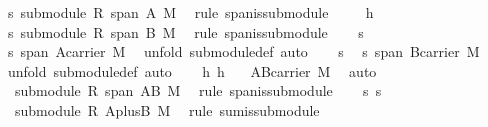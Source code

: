 \begin{isabellebody}
\ s{}{\isacharcolon}\ {\isachardoublequoteopen}submodule\ R\ {\isacharparenleft}span\ A{\isacharparenright}\ M{\isachardoublequoteclose}\ \isamarkupfalse%
\ {\isacharparenleft}rule\ span{\isacharunderscore}is{\isacharunderscore}submodule{\isacharparenright}\isanewline
\ \ \isamarkupfalse%
\ \ h{}\ \isamarkupfalse%
\ s{}{\isacharcolon}\ {\isachardoublequoteopen}submodule\ R\ {\isacharparenleft}span\ B{\isacharparenright}\ M{\isachardoublequoteclose}\ \isamarkupfalse%
\ {\isacharparenleft}rule\ span{\isacharunderscore}is{\isacharunderscore}submodule{\isacharparenright}\isanewline
\ \ \isamarkupfalse%
\ s{}\ \isamarkupfalse%
\ s{}{\isacharunderscore}{}{\isacharcolon}\ {\isachardoublequoteopen}{\isacharparenleft}span\ A{\isacharparenright}{\isasymsubseteq}carrier\ M{\isachardoublequoteclose}\ \isamarkupfalse%
\ {\isacharparenleft}unfold\ submodule{\isacharunderscore}def{\isacharcomma}\ auto{\isacharparenright}\isanewline
\ \ \isamarkupfalse%
\ s{}\ \isamarkupfalse%
\ s{}{\isacharunderscore}{}{\isacharcolon}\ {\isachardoublequoteopen}{\isacharparenleft}span\ B{\isacharparenright}{\isasymsubseteq}carrier\ M{\isachardoublequoteclose}\ \isamarkupfalse%
\ {\isacharparenleft}unfold\ submodule{\isacharunderscore}def{\isacharcomma}\ auto{\isacharparenright}\isanewline
\ \ \isamarkupfalse%
\ h{}\ h{}\ \isamarkupfalse%
\ {}{\isacharcolon}\ {\isachardoublequoteopen}A{\isasymunion}B{\isasymsubseteq}carrier\ M{\isachardoublequoteclose}\ \isamarkupfalse%
\ auto\isanewline
\ \ \isamarkupfalse%
\ \ {}\ \isamarkupfalse%
\ {}{\isacharcolon}\ {\isachardoublequoteopen}submodule\ R\ {\isacharparenleft}span\ {\isacharparenleft}A{\isasymunion}B{\isacharparenright}{\isacharparenright}\ M{\isachardoublequoteclose}\ \isamarkupfalse%
\ {\isacharparenleft}rule\ span{\isacharunderscore}is{\isacharunderscore}submodule{\isacharparenright}\isanewline
\ \ \isamarkupfalse%
\ s{}\ s{}\ \isamarkupfalse%
\ {}{\isacharcolon}\ {\isachardoublequoteopen}submodule\ R\ {\isacharquery}AplusB\ M{\isachardoublequoteclose}\ \isamarkupfalse%
\ {\isacharparenleft}rule\ sum{\isacharunderscore}is{\isacharunderscore}submodule{\isacharparenright}\isanewline

\end{isabellebody}
